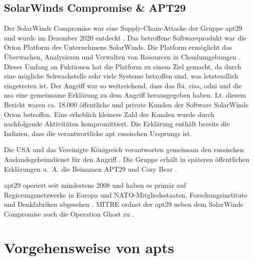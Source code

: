 \documentclass[conference]{IEEEtran}
\begin{document}
\subsection{SolarWinds Compromise \& APT29}
\label{sec:introduction:solarwinds}

Der SolarWinds Compromise war eine Supply-Chain-Attacke der Gruppe \ac{apt}29 und wurde im Dezember 2020 entdeckt \cite{MITRESolarwindsCompromise}.
Das betroffene Softwareprodukt war die Orion Platform des Unternehmens SolarWinds.
Die Platform ermöglicht das Überwachen, Analysieren und Verwalten von Resourcen in Cloudumgebungen \cite{OrionPlatform}.
Dieser Umfang an Fuktionen hat die Platform zu einem Ziel gemacht, da durch eine mögliche Schwachstelle sehr viele Systeme betroffen sind, was letztendlich eingetreten ist.
Der Angriff war so weitreichend, dass das \ac{fbi}, \ac{cisa}, \ac{odni} und die \ac{nsa} eine gemeinsame Erklärung \cite{JointStatement} zu dem Angriff herausgegeben haben.
Lt. diesem Bericht waren ca. 18.000 öffentliche und private Kunden der Software SolarWinds Orion betroffen.
Eine erheblich kleinere Zahl der Kunden wurde durch nachfolgende Aktivitäten kompromittiert.
Die Erklärung enthält bereits die Indizien, dass die verantwortliche \ac{apt} russischen Ursprungs ist.

Die USA und das Vereinigte Königreich verantworten gemeinsam den russischen Auslandsgeheimdienst für den Angriff \cite{USUKSVR}.
Die Gruppe erhält in späteren öffentlichen Erklärungen u.~A. die Beinamen APT29 und Cozy Bear \cite{CybersecurityAdvisoryAPT29}.

\ac{apt}29 operiert seit mindestens 2008 und haben es primär auf Regierungsnetzwerke in Europa und NATO-Mitgliedsstaaten, Forschungsinstitute und Denkfabriken abgesehen \cite{MITREAPT29}.
MITRE ordnet der \ac{apt}29 neben dem SolarWinds Compromise auch die Operation Ghost zu \cite{MITREAPT29}.

\section{Vorgehensweise von \aclp{apt}}
\end{document}
